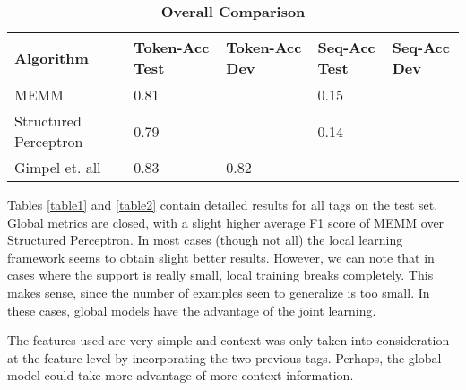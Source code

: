 \documentclass[11pt]{article}
\begin{document}
\begin{table}[htbp]
\centering
    \begin{tabular}{ | l | l | l | l | l |  }
    \hline
    Algorithm & Token-Acc Test & Token-Acc Dev & Seq-Acc Test & Seq-Acc Dev  \\ \hline
    MEMM & 0.81& ~ & 0.15 & ~  \\ \hline
    Structured Perceptron & 0.79 & ~ & 0.14 & ~ \\ \hline
    Gimpel et. all  & 0.83 & 0.82 &  ~  & ~  \\
    \hline
    \end{tabular}
       \caption{ \textbf{Overall Comparison }}
\label{table3}
\end{table}

Tables \ref{table1} and \ref{table2} contain detailed results for all tags on the test set. Global metrics are closed, with a slight higher average F1 score of MEMM over Structured Perceptron. In most cases (though not all) the local learning framework seems to obtain slight better results. However, we can note that in cases where the support is really small, local training breaks completely. This makes sense, since the number of examples seen to generalize is too small. In these cases, global models have the advantage of the joint learning. 

The features used are very simple and context was only taken into consideration at the feature level by incorporating the two previous tags. Perhaps, the global model could take more advantage of more context information.  
\end{document}
